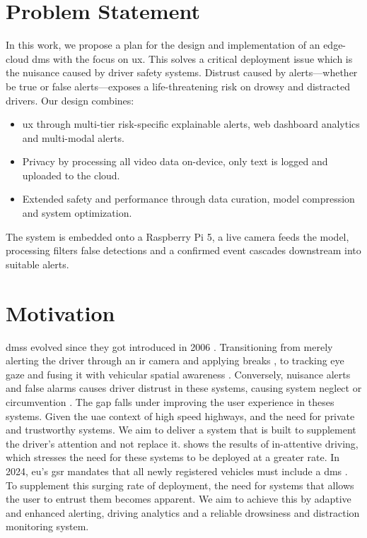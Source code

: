 \section{Problem Statement}                      
In this work, we propose a plan for the design and implementation of an edge-cloud \gls{dms} with the focus on \gls{ux}. This solves a critical deployment issue which is the nuisance caused by driver safety systems. Distrust caused by alerts---whether be true or false alerts---exposes a life-threatening risk on drowsy and distracted drivers. Our design combines:
\begin{itemize}
    \item \gls{ux} through multi-tier risk-specific explainable alerts, web dashboard analytics and multi-modal alerts.
    \item Privacy by processing all video data on-device, only text is logged and uploaded to the cloud.
    \item Extended safety and performance through data curation, model compression and system optimization.
\end{itemize}
The system is embedded onto a Raspberry Pi 5, a live camera feeds the model, processing filters false detections and a confirmed event cascades downstream into suitable alerts. 

\section{Motivation}


\glspl{dms} evolved since they got introduced in 2006 \cite{r7}. Transitioning from merely alerting the driver through an \gls{ir} camera and applying breaks \cite{r8}, to tracking eye gaze and fusing it with vehicular spatial awareness \cite{r9}. Conversely, nuisance alerts and false alarms causes driver distrust in these systems, causing system neglect or circumvention \cite{r10}. The gap falls under improving the user experience in theses systems. Given the \gls{uae} context of high speed highways, and the need for private and trustworthy systems. We aim to deliver a system that is built to supplement the driver's attention and not replace it.  shows the results of in-attentive driving, which stresses the need for these systems to be deployed at a greater rate. In 2024, \gls{eu}’s \gls{gsr} mandates that all newly registered vehicles must include a \gls{dms} \cite{r11}. To supplement this surging rate of deployment, the need for systems that allows the user to entrust them becomes apparent.  We aim to achieve this by adaptive and enhanced alerting, driving analytics and a reliable drowsiness and distraction monitoring system. 



